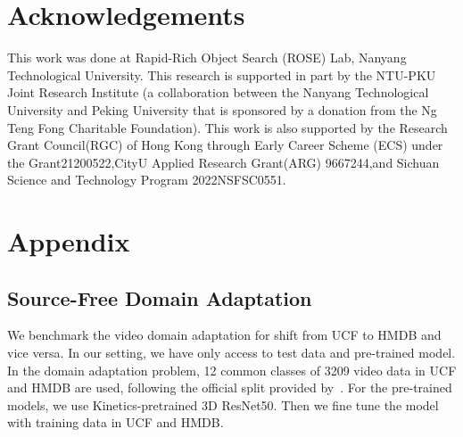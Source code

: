 \documentclass{article} %
\begin{document}
\section{Acknowledgements}
This work was done at Rapid-Rich Object Search (ROSE) Lab, Nanyang Technological University. This research is supported in part by the NTU-PKU Joint Research Institute (a collaboration between the Nanyang Technological University and Peking University that is sponsored by a donation from the Ng Teng Fong Charitable Foundation). This work is also supported by the Research Grant Council(RGC) of Hong Kong through Early Career Scheme (ECS) under the Grant21200522,CityU Applied Research Grant(ARG) 9667244,and Sichuan Science and Technology Program 2022NSFSC0551.




\newpage
\appendix
\section{Appendix}
\subsection{Source-Free Domain Adaptation}
We benchmark the video domain adaptation for shift from UCF to HMDB and vice versa. In our setting, we have only access to test data and pre-trained model. In the domain adaptation problem, 12 common classes of 3209 video data in UCF and HMDB are used, following the official split provided by~\citep{chen2019temporal}. For the pre-trained models, we use Kinetics-pretrained 3D ResNet50. Then we fine tune the model with training data in UCF and HMDB.
\end{document}
